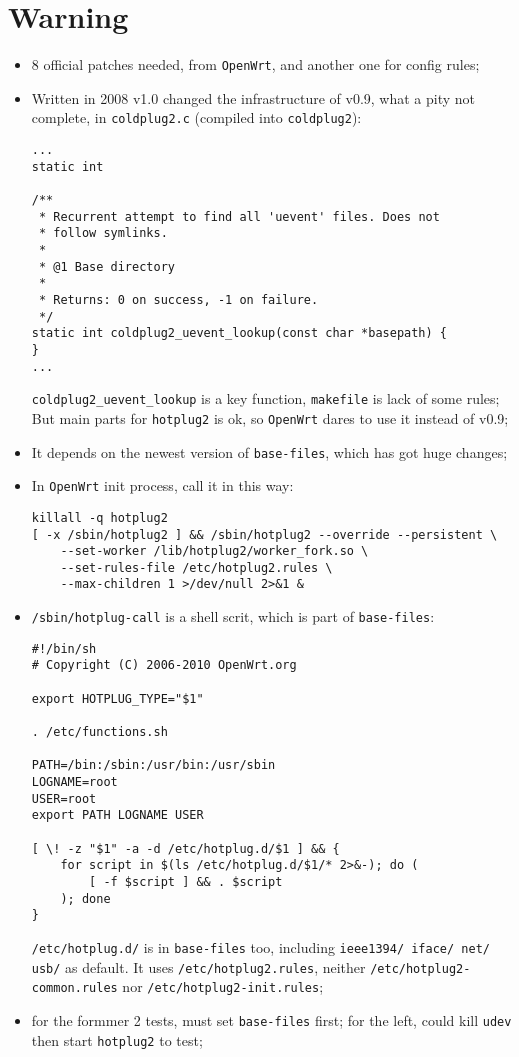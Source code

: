 \documentclass[a4paper]{report}
\begin{document}
\section{Warning}
\begin{itemize}
    \item 8 official patches needed, from {\tt OpenWrt}, and another one for config rules;
    \item Written in 2008 v1.0 changed the infrastructure of v0.9, what a pity not 
          complete, in {\tt coldplug2.c} (compiled into {\tt coldplug2}):
\begin{lstlisting}
...
static int 

/**
 * Recurrent attempt to find all 'uevent' files. Does not
 * follow symlinks.
 *
 * @1 Base directory
 * 
 * Returns: 0 on success, -1 on failure.
 */
static int coldplug2_uevent_lookup(const char *basepath) {
}
...
\end{lstlisting}
          {\tt coldplug2\_uevent\_lookup} is a key function, {\tt makefile} is lack
          of some rules; But main parts for {\tt hotplug2} is ok, so {\tt OpenWrt}
          dares to use it instead of v0.9;
    \item It depends on the newest version of {\tt base-files}, which has got huge changes;
    \item In {\tt OpenWrt} init process, call it in this way:
\begin{lstlisting}
killall -q hotplug2
[ -x /sbin/hotplug2 ] && /sbin/hotplug2 --override --persistent \
    --set-worker /lib/hotplug2/worker_fork.so \
    --set-rules-file /etc/hotplug2.rules \
    --max-children 1 >/dev/null 2>&1 &
\end{lstlisting}
    \item  {\tt /sbin/hotplug-call} is a shell scrit, which is part of {\tt base-files}:
\begin{lstlisting}
#!/bin/sh
# Copyright (C) 2006-2010 OpenWrt.org

export HOTPLUG_TYPE="$1"

. /etc/functions.sh

PATH=/bin:/sbin:/usr/bin:/usr/sbin
LOGNAME=root
USER=root
export PATH LOGNAME USER

[ \! -z "$1" -a -d /etc/hotplug.d/$1 ] && {
	for script in $(ls /etc/hotplug.d/$1/* 2>&-); do (
		[ -f $script ] && . $script
	); done
}
\end{lstlisting}
          {\tt /etc/hotplug.d/} is in {\tt base-files} too, including {\tt ieee1394/
          iface/ net/ usb/} as default. It uses
          {\tt /etc/hotplug2.rules}, neither {\tt /etc/hotplug2-common.rules} nor 
          {\tt /etc/hotplug2-init.rules};
    \item for the formmer 2 tests, must set {\tt base-files} first; for the left, could
          kill {\tt udev} then start {\tt hotplug2} to test;
\end{itemize}
\end{document}
